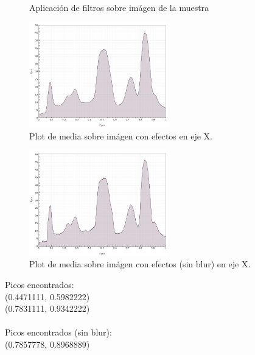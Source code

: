 \begin{itemize}
\begin{figure}[H]
	\caption{Aplicaci\'on de filtros sobre im\'agen de la muestra}
	\centering
	\end{figure}
	\begin{figure}[H]
	  \vspace{-0.2cm}
	  \centering
	  \includegraphics[width=230px]{imagenes-jtlc/experimento/search-peaks/5/plot-x}
	  \centering
	  \vspace{-0.4cm}
	  \caption{Plot de media sobre im\'agen con efectos en eje X.}
	  \label{fig:sp-5-plot-x-no-blur--repetido}
	  \vspace{-0.15cm}
	\end{figure}
	\begin{figure}[H]
	  \vspace{-0.2cm}
	  \centering
	  \includegraphics[width=230px]{imagenes-jtlc/experimento/search-peaks/5/plot-x-no-blur}
	  \centering
	  \vspace{-0.4cm}
	  \caption{Plot de media sobre im\'agen con efectos (sin blur) en eje X.}
	  \label{fig:sp-5-plot-x-no-blur}
	  \vspace{-0.15cm}
	\end{figure}
	Picos encontrados: \\
	(0.4471111, 0.5982222)\\
	(0.7831111, 0.9342222)\\ \\
	Picos encontrados (sin blur):\\
	(0.7857778, 0.8968889)\\
	

\end{itemize}
